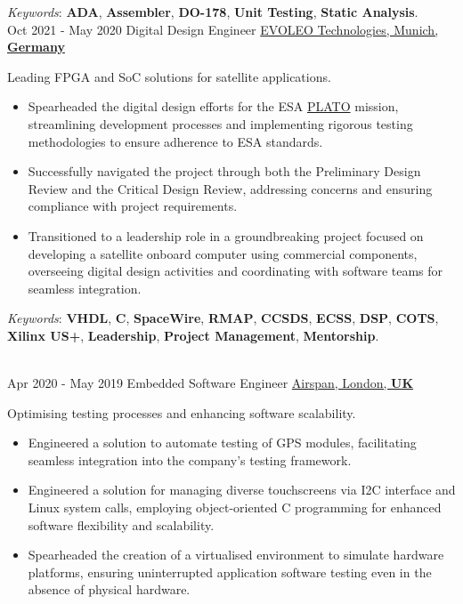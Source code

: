 \documentclass[letterpaper]{twentysecondcv} %
\begin{document}
\begin{twenty}
{            \vspace{1 mm}
            \textit{Keywords}: \textbf{ADA}, \textbf{Assembler}, \textbf{DO-178}, \textbf{Unit Testing}, \textbf{Static Analysis}.
        }\\
    \twentyitem
        {Oct 2021 -}
    	{May 2020}
        {Digital Design Engineer}
        {\href{http://evoleotech.com/company/}{EVOLEO Technologies, Munich, \textbf{Germany}}}
        {}
        {
            Leading FPGA and SoC solutions for satellite applications.
            \vspace{1 mm}
            \begin{itemize}
                \item Spearheaded the digital design efforts for the ESA \href{https://sci.esa.int/web/plato}{PLATO} mission, streamlining development processes and implementing rigorous testing methodologies to ensure adherence to ESA standards.
                \item Successfully navigated the project through both the Preliminary Design Review and the Critical Design Review, addressing concerns and ensuring compliance with project requirements.
                \item Transitioned to a leadership role in a groundbreaking project focused on developing a satellite onboard computer using commercial components, overseeing digital design activities and coordinating with software teams for seamless integration.
            \end{itemize}

            \vspace{1 mm}
            \textit{Keywords}: \textbf{VHDL}, \textbf{C}, \textbf{SpaceWire}, \textbf{RMAP}, \textbf{CCSDS}, \textbf{ECSS}, \textbf{DSP}, \textbf{COTS}, \textbf{Xilinx US+}, \textbf{Leadership}, \textbf{Project Management}, \textbf{Mentorship}.
        }\\
    \twentyitem
    	{Apr 2020 -}
		{May 2019}
        {Embedded Software Engineer}
        {\href{https://www.airspan.com/}{Airspan, London, \textbf{UK}}}
        {}
        {
            Optimising testing processes and enhancing software scalability.
            \vspace{1 mm}
            \begin{itemize}
                \item Engineered a solution to automate testing of GPS modules, facilitating seamless integration into the company's testing framework.
                \item Engineered a solution for managing diverse touchscreens via I2C interface and Linux system calls, employing object-oriented C programming for enhanced software flexibility and scalability.
                \item Spearheaded the creation of a virtualised environment to simulate hardware platforms, ensuring uninterrupted application software testing even in the absence of physical hardware.
            \end{itemize}

}
\end{twenty}
\end{document}
